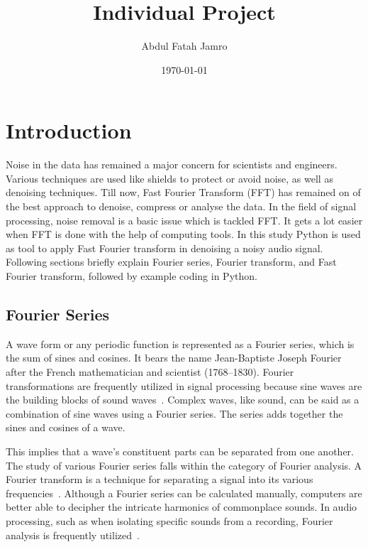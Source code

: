 \documentclass[a4paper, 12pt]{scrartcl}
\title{Individual Project}
\author{Abdul Fatah Jamro}
\date{\today}
\begin{document}
  
\maketitle
 
\tableofcontents

\newpage

\section{Introduction}


Noise in the data has remained a major concern for scientists and engineers.
Various techniques are used like shields to protect or avoid noise, as well as denoising techniques.
Till now, Fast Fourier Transform (FFT) has remained on of the best approach to denoise, compress or analyse the data.
In the field of signal processing, noise removal is a basic issue which is tackled FFT.
It gets a lot easier when FFT is done with the help of computing tools.
In this study Python is used as tool to apply Fast Fourier transform in denoising a noisy audio signal.
Following sections briefly explain Fourier series, Fourier transform, and Fast Fourier transform, followed by example coding in Python. 

\subsection{Fourier Series}
A wave form or any periodic function is represented as a Fourier series, which is the sum of sines and cosines.
It bears the name Jean-Baptiste Joseph Fourier after the French mathematician and scientist (1768--1830).
Fourier transformations are frequently utilized in signal processing because sine waves are the building blocks of sound waves~\cite{tolstov1976fourier}.
Complex waves, like sound, can be said as a combination of sine waves using a Fourier series.
The series adds together the sines and cosines of a wave.

This implies that a wave's constituent parts can be separated from one another.
The study of various Fourier series falls within the category of Fourier analysis.
A Fourier transform is a technique for separating a signal into its various frequencies~\cite{tolstov1976fourier}.
Although a Fourier series can be calculated manually, computers are better able to decipher the intricate harmonics of commonplace sounds.
In audio processing, such as when isolating specific sounds from a recording, Fourier analysis is frequently utilized~\cite{tolstov1976fourier}.
\end{document}
